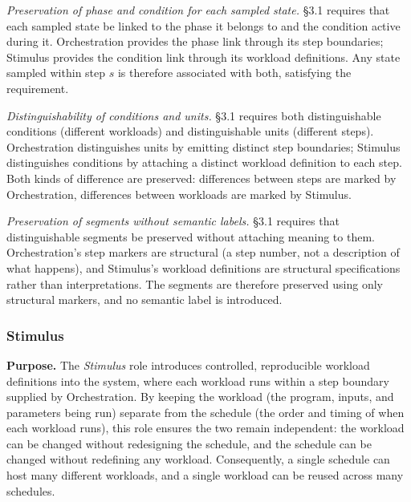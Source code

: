   \emph{Preservation of phase and condition for each sampled state.} \S3.1 requires that each sampled state be linked to the phase it belongs to and the condition active during it. Orchestration provides the phase link through its step boundaries; Stimulus provides the condition link through its workload definitions. Any state sampled within step $s$ is therefore associated with both, satisfying the requirement.

  \emph{Distinguishability of conditions and units.} \S3.1 requires both distinguishable conditions (different workloads) and distinguishable units (different steps). Orchestration distinguishes units by emitting distinct step boundaries; Stimulus distinguishes conditions by attaching a distinct workload definition to each step. Both kinds of difference are preserved: differences between steps are marked by Orchestration, differences between workloads are marked by Stimulus.

  \emph{Preservation of segments without semantic labels.} \S3.1 requires that distinguishable segments be preserved without attaching meaning to them. Orchestration's step markers are structural (a step number, not a description of what happens), and Stimulus's workload definitions are structural specifications rather than interpretations. The segments are therefore preserved using only structural markers, and no semantic label is introduced.

  \subsubsection{Stimulus}
  \textbf{Purpose.} The \emph{Stimulus} role introduces controlled, reproducible workload definitions into the system, where each workload runs within a step boundary supplied by Orchestration. By keeping the workload (the program, inputs, and parameters being run) separate from the schedule (the order and timing of when each workload runs), this role ensures the two remain independent: the workload can be changed without redesigning the schedule, and the schedule can be changed without redefining any workload. Consequently, a single schedule can host many different workloads, and a single workload can be reused across many schedules.

